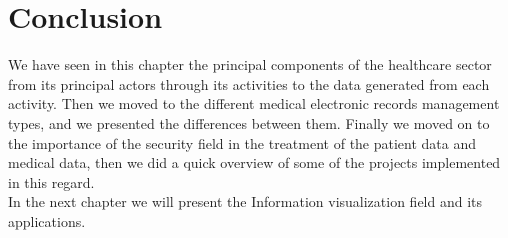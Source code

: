\section{Conclusion}
We have seen in this chapter the principal components of the healthcare sector from its principal actors through its activities to the data generated from each activity. Then we moved to the different medical electronic records management types, and we presented the differences between them. Finally we moved on to the importance of the security field in the treatment of the patient data and medical data, then we did a quick overview of some of the projects implemented in this regard.\\
In the next chapter we will present the Information visualization field and its applications.
